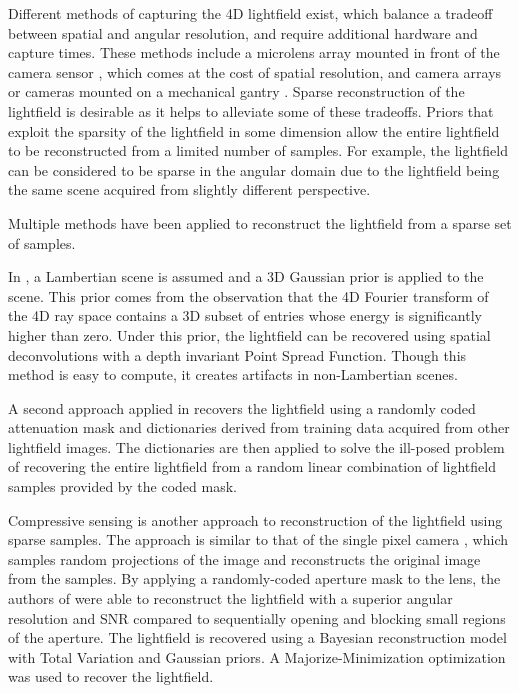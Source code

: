 \documentclass[10pt,twocolumn,letterpaper]{article}
\begin{document}
Different methods of capturing the 4D lightfield exist, which balance a tradeoff between spatial and angular resolution, and require additional hardware and capture times. These methods include a microlens array mounted in front of the camera sensor \cite{NgLF}, which comes at the cost of spatial resolution, and camera arrays \cite{LFArray} or cameras mounted on a mechanical gantry \cite{LFRendering}. Sparse reconstruction of the lightfield is desirable as it helps to alleviate some of these tradeoffs. Priors that exploit the sparsity of the lightfield in some dimension allow the entire lightfield to be reconstructed from a limited number of samples. For example, the lightfield can be considered to be sparse in the angular domain due to the lightfield being the same scene acquired from slightly different perspective. 

Multiple methods have been applied to reconstruct the lightfield from a sparse set of samples. \cite{GordonArticle3}

In \cite{DimGapLFPrior}, a Lambertian scene is assumed and a 3D Gaussian prior is applied to the scene. This prior comes from the observation that the 4D Fourier transform of the 4D ray space contains a 3D subset of entries whose energy is significantly higher than zero. Under this prior, the lightfield can be recovered using spatial deconvolutions with a depth invariant Point Spread Function. Though this method is easy to compute, it creates artifacts in non-Lambertian scenes.

A second approach applied in \cite{LFDict} recovers the lightfield using a randomly coded attenuation mask and dictionaries derived from training data acquired from other lightfield images. The dictionaries are then applied to solve the ill-posed problem of recovering the entire lightfield from a random linear combination of lightfield samples provided by the coded mask.

Compressive sensing \cite{IntroCS}\cite{CompressiveSensingMega} is another approach to reconstruction of the lightfield using sparse samples. The approach is similar to that of the single pixel camera \cite{SinglePixelCamera}, which samples random projections of the image and reconstructs the original image from the samples. By applying a randomly-coded aperture mask to the lens, the authors of \cite{SparsityInCFD} were able to reconstruct the lightfield with a superior angular resolution and SNR compared to sequentially opening and blocking small regions of the aperture. The lightfield is recovered using a Bayesian reconstruction model with Total Variation and Gaussian priors. A Majorize-Minimization optimization was used to recover the lightfield.
\end{document}
